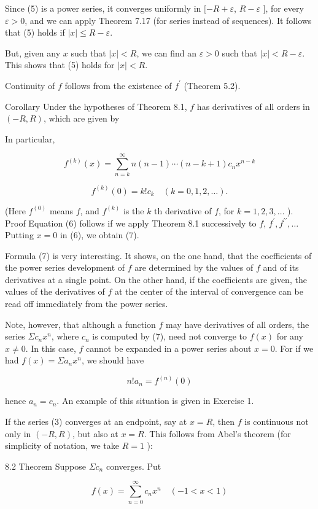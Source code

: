 \documentclass[10pt]{article}
\begin{document}
Since (5) is a power series, it converges uniformly in $[-R+\varepsilon$, $R-\varepsilon$ ], for every $\varepsilon>0$, and we can apply Theorem 7.17 (for series instead of sequences). It follows that (5) holds if $|x| \leq R-\varepsilon$.

But, given any $x$ such that $|x|<R$, we can find an $\varepsilon>0$ such that $|x|<R-\varepsilon$. This shows that (5) holds for $|x|<R$.

Continuity of $f$ follows from the existence of $f^{\prime}$ (Theorem 5.2).

Corollary Under the hypotheses of Theorem 8.1, $f$ has derivatives of all orders in $(-R, R)$, which are given by

In particular,

$$
f^{(k)}(x)=\sum_{n=k}^{\infty} n(n-1) \cdots(n-k+1) c_{n} x^{n-k}
$$

$$
f^{(k)}(0)=k ! c_{k} \quad(k=0,1,2, \ldots) .
$$

(Here $f^{(0)}$ means $f$, and $f^{(k)}$ is the $k$ th derivative of $f$, for $k=1,2,3, \ldots$ ). Proof Equation (6) follows if we apply Theorem 8.1 successively to $f$, $f^{\prime}, f^{\prime \prime}, \ldots$ Putting $x=0$ in (6), we obtain (7).

Formula (7) is very interesting. It shows, on the one hand, that the coefficients of the power series development of $f$ are determined by the values of $f$ and of its derivatives at a single point. On the other hand, if the coefficients are given, the values of the derivatives of $f$ at the center of the interval of convergence can be read off immediately from the power series.

Note, however, that although a function $f$ may have derivatives of all orders, the series $\Sigma c_{n} x^{n}$, where $c_{n}$ is computed by (7), need not converge to $f(x)$ for any $x \neq 0$. In this case, $f$ cannot be expanded in a power series about $x=0$. For if we had $f(x)=\Sigma a_{n} x^{n}$, we should have

$$
n ! a_{n}=f^{(n)}(0)
$$

hence $a_{n}=c_{n}$. An example of this situation is given in Exercise 1.

If the series (3) converges at an endpoint, say at $x=R$, then $f$ is continuous not only in $(-R, R)$, but also at $x=R$. This follows from Abel's theorem (for simplicity of notation, we take $R=1$ ):

8.2 Theorem Suppose $\Sigma c_{n}$ converges. Put

$$
f(x)=\sum_{n=0}^{\infty} c_{n} x^{n} \quad(-1<x<1)
$$
\end{document}
